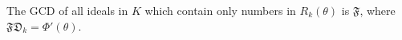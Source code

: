 The GCD of all ideals in $K$ which contain only numbers in $R_k(\theta)$ is $\mathfrak{F}$, where $\mathfrak{F}\mathfrak{D}_k = \Phi'(\theta)$.
